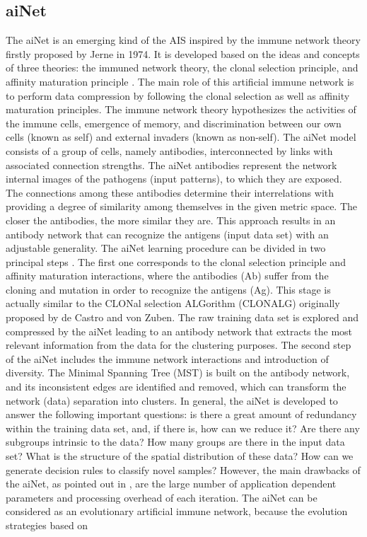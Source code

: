 \documentclass{article}
\begin{document}
\subsection{aiNet}
The aiNet is an emerging kind of the AIS inspired by the immune network theory firstly proposed by Jerne in 1974. It is developed based on the ideas and concepts of three theories: the immuned network theory, the clonal selection principle, and affinity maturation principle . The main role of this artificial immune network is to perform data
compression by following the clonal selection as well as affinity maturation principles. The immune network theory hypothesizes the activities of the immune cells, emergence of memory, and discrimination between our own cells (known as self) and external invaders (known as non-self). The aiNet model consists of a group of cells, namely antibodies, interconnected by links with associated connection strengths. The aiNet antibodies represent the network internal images of the pathogens (input patterns), to which they are exposed. The connections among these antibodies determine their interrelations with providing a degree of similarity among themselves in the given metric space. The closer the antibodies, the more similar they are. This approach results in an antibody network that can recognize the antigens (input data set) with an adjustable generality. The aiNet learning procedure can be divided in two principal steps . The first one corresponds to the clonal selection principle and affinity maturation interactions, where the antibodies (Ab) suffer from the cloning and mutation in order
to recognize the antigens (Ag). This stage is actually similar to the CLONal selection ALGorithm (CLONALG) originally proposed by de Castro and von Zuben. The raw training data set is explored and compressed by the aiNet leading to an antibody network that extracts the most relevant information from the data for the clustering purposes. The second step of the aiNet includes the immune network interactions and introduction of diversity. The Minimal Spanning Tree (MST) is built on the antibody network, and its inconsistent edges are identified and removed, which can transform the network (data) separation into clusters.
In general, the aiNet is developed to answer the following important questions: is there a great amount of redundancy within the training data set, and, if there is, how can we reduce it? Are there any subgroups intrinsic to the data? How many groups are there in the input data set? What is the structure of the spatial distribution of these data? How can we generate decision rules to classify novel samples? However, the main drawbacks of the aiNet, as pointed out in , are the large number of application dependent parameters and processing overhead of each iteration. The aiNet can be considered as an evolutionary artificial immune network, because the evolution strategies based on
\end{document}
